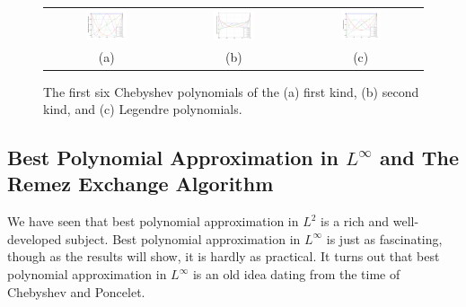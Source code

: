 \begin{figure}[htbp]
\begin{center}
\begin{tabular}{ccc}
\hspace*{-0.5cm}\includegraphics[width=0.35\textwidth]{chebyshevt}&
\hspace*{-0.5cm}\includegraphics[width=0.35\textwidth]{chebyshevu}&
\hspace*{-0.5cm}\includegraphics[width=0.35\textwidth]{legendre}\\
(a) & (b) & (c)\\
\end{tabular}
\caption{The first six Chebyshev polynomials of the (a) first kind, (b) second kind, and (c) Legendre polynomials.}
\label{figure:TUP}
\end{center}
\end{figure}

\subsection{Best Polynomial Approximation in $L^\infty$ and The Remez Exchange Algorithm}

We have seen that best polynomial approximation in $L^2$ is a rich and well-developed subject. Best polynomial approximation in $L^\infty$ is just as fascinating, though as the results will show, it is hardly as practical. It turns out that best polynomial approximation in $L^\infty$ is an old idea dating from the time of Chebyshev and Poncelet.

